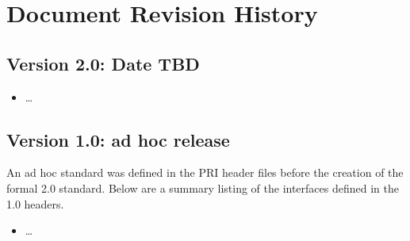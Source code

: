 \chapter{Document Revision History}
\label{chap:history}

\section{Version 2.0: Date TBD}

\begin{itemize}
\item \ldots
\end{itemize}


\section{Version 1.0: ad hoc release}

\par
An ad hoc standard was defined in the \acf{PRI} header files before the creation of the formal 2.0 standard.
Below are a summary listing of the interfaces defined in the 1.0 headers.

\begin{itemize}
\item \ldots
\end{itemize}
